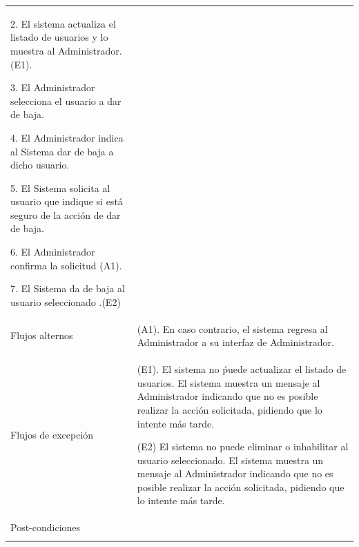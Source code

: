 \begin{longtable}{@{\extracolsep{8pt}}l p{8.5cm}}
 2. El sistema actualiza el listado de usuarios y lo muestra al Administrador.(E1). \par\vspace{.1cm}

 3. El Administrador selecciona el usuario a dar de baja. \par\vspace{.1cm}

 4. El Administrador indica al Sistema dar de baja a dicho usuario. \par\vspace{.1cm}

 5. El Sistema solicita al usuario que indique si está seguro de la acción de dar de baja. \par\vspace{.1cm}

 6. El Administrador confirma la solicitud (A1). \par\vspace{.1cm}

 7. El Sistema da de baja al usuario seleccionado .(E2) \par\vspace{.1cm}

\\

\hspace{.2cm}Flujos alternos &
\par (A1). En caso contrario, el sistema regresa al Administrador a su interfaz de Administrador.



\\

\hspace{.2cm}Flujos de excepción &
\par\vspace{.1cm} (E1). El sistema no ṕuede actualizar el listado de usuarios. El sistema muestra un mensaje al Administrador indicando que no es posible realizar la acción solicitada, pidiendo que lo intente más tarde.

\par\vspace{.1cm} (E2) El sistema no puede eliminar o inhabilitar al usuario seleccionado. El sistema muestra un mensaje al Administrador indicando que no es posible realizar la acción solicitada, pidiendo que lo intente más tarde.


\\%

\hspace{.2cm}Post-condiciones &
\\
\hline

 \\
\end{longtable}
\endgroup


